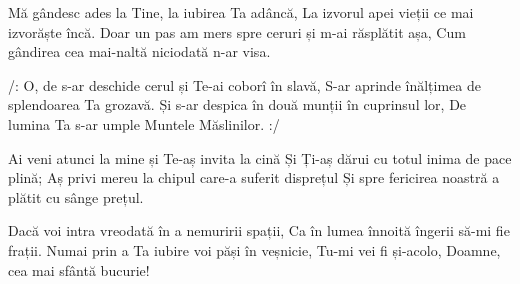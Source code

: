 \beginverse
Mă gândesc ades la Tine, la iubirea Ta adâncă,
La izvorul apei vieții ce mai izvorăște încă.
Doar un pas am mers spre ceruri și m-ai răsplătit așa,
Cum gândirea cea mai-naltă niciodată n-ar visa.
\endverse

\beginchorus
/: O, de s-ar deschide cerul și Te-ai coborî în slavă,
S-ar aprinde înălțimea de splendoarea Ta grozavă.
Și s-ar despica în două munții în cuprinsul lor,
De lumina Ta s-ar umple Muntele Măslinilor. :/
\endchorus

\beginverse
Ai veni atunci la mine și Te-aș invita la cină
Și Ți-aș dărui cu totul inima de pace plină;
Aș privi mereu la chipul care-a suferit disprețul
Și spre fericirea noastră a plătit cu sânge prețul.
\endverse

\beginverse
Dacă voi intra vreodată în a nemuririi spații,
Ca în lumea înnoită îngerii să-mi fie frații.
Numai prin a Ta iubire voi păși în veșnicie,
Tu-mi vei fi și-acolo, Doamne, cea mai sfântă bucurie!
\endverse
\endsong